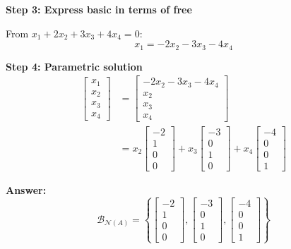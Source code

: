 \documentclass[12pt,a4paper]{article}
\theoremstyle{definition}
\begin{document}
\textbf{Step 3: Express basic in terms of free}

From $x_1 + 2x_2 + 3x_3 + 4x_4 = 0$:
\begin{equation}
x_1 = -2x_2 - 3x_3 - 4x_4
\end{equation}

\textbf{Step 4: Parametric solution}
\begin{align}
\begin{bmatrix} x_1 \\ x_2 \\ x_3 \\ x_4 \end{bmatrix} &= \begin{bmatrix} -2x_2 - 3x_3 - 4x_4 \\ x_2 \\ x_3 \\ x_4 \end{bmatrix} \\
&= x_2\begin{bmatrix} -2 \\ 1 \\ 0 \\ 0 \end{bmatrix} + x_3\begin{bmatrix} -3 \\ 0 \\ 1 \\ 0 \end{bmatrix} + x_4\begin{bmatrix} -4 \\ 0 \\ 0 \\ 1 \end{bmatrix}
\end{align}

\textbf{Answer:}
\begin{equation}
\mathcal{B}_{\mathcal{N}(A)} = \left\{\begin{bmatrix} -2 \\ 1 \\ 0 \\ 0 \end{bmatrix}, \begin{bmatrix} -3 \\ 0 \\ 1 \\ 0 \end{bmatrix}, \begin{bmatrix} -4 \\ 0 \\ 0 \\ 1 \end{bmatrix}\right\}
\end{equation}
\end{document}
